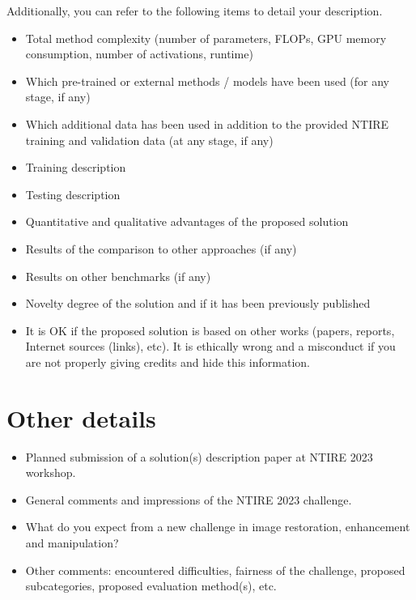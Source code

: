 \documentclass[10pt,twocolumn,letterpaper]{article}
\begin{document}
Additionally, you can refer to the following items to detail your description.
\begin{itemize}
\item Total method complexity (number of parameters, FLOPs, GPU memory consumption, number of activations, runtime)
\item Which pre-trained or external methods / models have been used (for any stage, if any) 
\item Which additional data has been used in addition to the provided NTIRE training and validation data (at any stage, if any) 
\item Training description
\item Testing description
\item Quantitative and qualitative advantages of the proposed solution
\item Results of the comparison to other approaches (if any)
\item Results on other benchmarks (if any)
\item Novelty degree of the solution and if it has been previously published
\item It is OK if the proposed solution is based on other works (papers, reports, Internet sources (links), etc). It is ethically wrong and a misconduct if you are not properly giving credits and hide this information.
\end{itemize}


\section{Other details}
\begin{itemize}
\item Planned submission of a solution(s) description paper at NTIRE 2023 workshop.
\item General comments and impressions of the NTIRE 2023 challenge. 
\item What do you expect from a new challenge in image restoration, enhancement and manipulation?
\item Other comments: encountered difficulties, fairness of the challenge, proposed subcategories, proposed evaluation method(s), etc.
\end{itemize}

{\small


}
\end{document}
